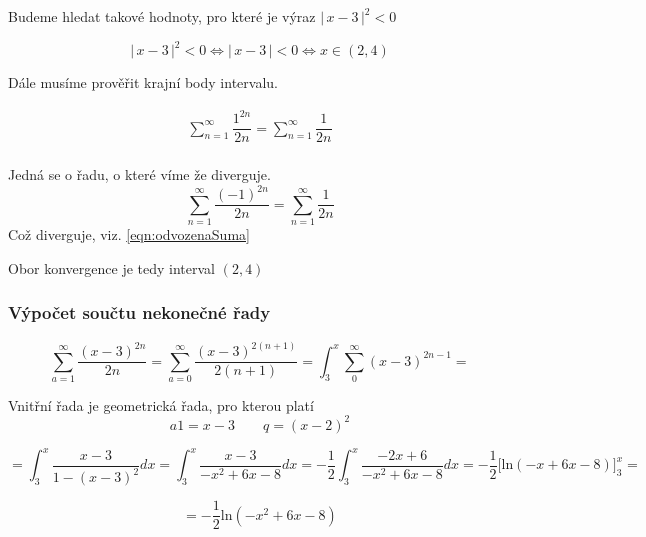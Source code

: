 \noindent Budeme hledat takové hodnoty, pro které je výraz $\big |\,x-3\,\big |^{2} < 0$

\begin{displaymath}
\big |\,x-3\,\big |^{2} < 0\Leftrightarrow \big |\,x-3\,\big | < 0 \Leftrightarrow x \in (2, 4)
\end{displaymath}

\noindent Dále musíme prověřit krajní body intervalu.

\begin{eqnarray}
\sum_{n=1}^{\infty} \dfrac{1^{2n}}{2n} = \sum_{n=1}^{\infty} \dfrac{1}{2n}\\
\label{eqn:odvozenaSuma}
\end{eqnarray}

\noindent Jedná se o řadu, o které víme že diverguje.
\begin{displaymath}
\sum_{n=1}^{\infty} \dfrac{(-1)^{2n}}{2n} = \sum_{n=1}^{\infty} \dfrac{1}{2n}
\end{displaymath}
\noindent Což diverguje, viz. \ref{eqn:odvozenaSuma}

\noindent Obor konvergence je tedy interval $(2, 4)$

\subsubsection{Výpočet součtu nekonečné řady}

\begin{displaymath}
\sum_{a = 1}^{\infty} \dfrac{(x - 3)^{2n}}{2n} = \sum_{a = 0}^{\infty} \dfrac{(x - 3)^{2(n + 1)}}{2(n + 1)} = \int_{3}^{x} \sum_0^{\infty} (x - 3)^{2n - 1} =
\end{displaymath}

Vnitřní řada je geometrická řada, pro kterou platí
\begin{displaymath}
a1 = x - 3 \qquad q = (x - 2)^2
\end{displaymath}

\begin{displaymath}
= \int_{3}^{x} \dfrac{x - 3}{1 - (x - 3)^2}dx =  \int_{3}^{x} \dfrac{x - 3}{- x^2+6x-8}dx = - \frac{1}{2}  \int_{3}^{x} \dfrac{-2x + 6}{- x^2+6x-8}dx =- \frac{1}{2} \Big [  \mbox{ln}(-x + 6x - 8) \Big ]_3^x = 
\end{displaymath}

\begin{displaymath}
= - \frac{1}{2} \mbox{ln}(-x^2 + 6x - 8)
\end{displaymath}



